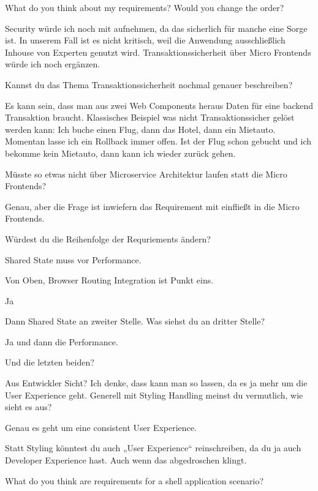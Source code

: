 \begin{description}
    \NicoVogel What do you think about my requirements? Would you change the order?

    \PhilippHuber Security würde ich noch mit aufnehmen, da das sicherlich für manche eine Sorge ist. In unserem Fall ist es nicht kritisch, weil die Anwendung ausschließlich Inhouse von Experten genutzt wird. Transaktionssicherheit über Micro Frontends würde ich noch ergänzen.

    \NicoVogel Kannst du das Thema Transaktionssicherheit nochmal genauer beschreiben?

    \PhilippHuber Es kann sein, dass man aus zwei Web Components heraus Daten für eine backend Transaktion braucht. Klassisches Beispiel was nicht Transaktionssicher gelöst werden kann: Ich buche einen Flug, dann das Hotel, dann ein Mietauto. Momentan lasse ich ein Rollback immer offen. Ist der Flug schon gebucht und ich bekomme kein Mietauto, dann kann ich wieder zurück gehen.

    \NicoVogel Müsste so etwas nicht über Microservice Architektur laufen statt die Micro Frontends?

    \PhilippHuber Genau, aber die Frage ist inwiefern das Requirement mit einfließt in die Micro Frontends.

    \NicoVogel Würdest du die Reihenfolge der Requriements ändern?

    \PhilippHuber Shared State muss vor Performance.

    \NicoVogel Von Oben, Browser Routing Integration ist Punkt eins.

    \PhilippHuber Ja

    \NicoVogel Dann Shared State an zweiter Stelle. Was siehst du an dritter Stelle?

    \PhilippHuber Ja und dann die Performance.

    \NicoVogel Und die letzten beiden?

    \PhilippHuber Aus Entwickler Sicht? Ich denke, dass kann man so lassen, da es ja mehr um die User Experience geht. Generell mit Styling Handling meinst du vermutlich, wie sieht es aus?

    \NicoVogel Genau es geht um eine consistent User Experience.

    \PhilippHuber Statt Styling könntest du auch „User Experience“ reinschreiben, da du ja auch Developer Experience hast. Auch wenn das abgedroschen klingt.

    \NicoVogel What do you think are requirements for a shell application scenario?


\end{description}
